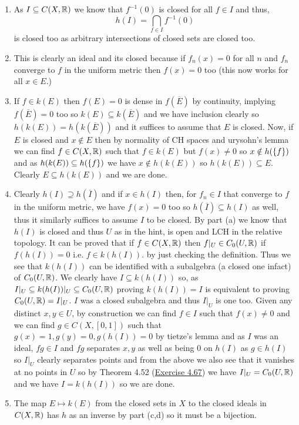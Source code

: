\documentclass[12pt,a4paper]{article}
\begin{document}
\begin{solution}
\begin{enumerate}[label=\alph*.]
    \item As $I \subseteq C(X,\mathbb{R})$ we know that $f^{-1}( \qty{0})$ is closed for all $f\in I$ and thus, 
    \[
        h(I)=\bigcap_{f\in I} f^{-1}( \qty{0})
    \]
    is closed too as arbitrary intersections of closed sets are closed too. 
    \item This is clearly an ideal and its closed because if $f_n(x)=0$ for all $n$ and $f_n$ converge to $f$ in the uniform metric then $f(x)=0$ too (this now works for all $x\in E$.) 
    \item If $f\in k(E)$ then $f(E)= \qty{0}$ is dense in $f( \overline{E})$ by continuity, implying $f( \overline{E})= \qty{0}$ too so $k(E) \subseteq k( \overline{E})$ and we have inclusion clearly so $h(k(E))=h(k( \overline{E}))$ and it suffices to assume that $E$ is closed. 
    Now, if $E$ is closed and $x\notin E$ then by normality of CH spaces and urysohn's lemma we can find $f\in C(X,\mathbb{R})$ such that $f\in k(E)$ but $f(x)\neq 0$ so $x\notin h( \qty{f})$ and as $h(k(E)) \subseteq h( \qty{f})$ we have $x\notin h(k(E))$ so $h(k(E)) \subseteq E$. 
    Clearly $E \subseteq h(k(E))$ and we are done. 
    \item Clearly $h(I)\supseteq h( \overline{I})$ and if $x\in h(I)$ then, for $f_n\in I$ that converge to $f$ in the uniform metric, we have $f(x)=0$ too so $h( \overline{I}) \subseteq h(I)$ as well, thus it similarly suffices to assume $I$ to be closed. 
    By part (a) we know that $h(I)$ is closed and thus $U$ as in the hint, is open and LCH in the relative topology. 
    It can be proved that if $f\in C(X,\mathbb{R})$ then $f|_{U}\in C_0(U,\mathbb{R})$ if $f(h(I))= \qty{0}$ i.e. $f\in k(h(I)).$ by just checking the definition. 
    Thus we see that $k(h(I))$ can be identified with a subalgebra (a closed one infact) of $C_0(U,\mathbb{R})$. 
    We clearly have $I \subseteq k(h(I))$ so, as $I|_{U} \subseteq k(h(I))|_U \subseteq C_0(U,\mathbb{R})$ proving $k(h(I))=I$ is equivalent to proving $C_0(U,\mathbb{R}) = I|_U$. 
    $I$ was a closed subalgebra and thus $I|_U$ is one too. 
    Given any distinct $x,y\in U$, by construction we can find $f\in I$ such that $f(x)\neq 0$ and we can find $g\in C(X,[0,1])$ such that $g(x)=1,g(y)=0,g(h(I))= \qty{0}$ by tietze's lemma and as $I$ was an ideal, $fg\in I$ and $fg$ separates $x,y$ as well as being $0$ on $h(I)$ as $g\in h(I)$ so $I|_U$ clearly separates points and from the above we also see that it vanishes at no points in $U$ so by Theorem 4.52 (\hyperref[prob:4-67]{Exercise 4.67}) we have $I|_U=C_0(U,\mathbb{R})$ and we have $I=k(h(I))$ so we are done. 
    \item The map $E\mapsto k(E)$ from the closed sets in $X$ to the closed ideals in $C(X,\mathbb{R})$ has $h$ as an inverse by part (c,d) so it must be a bijection.  
\end{enumerate}
\end{solution}
\end{document}
